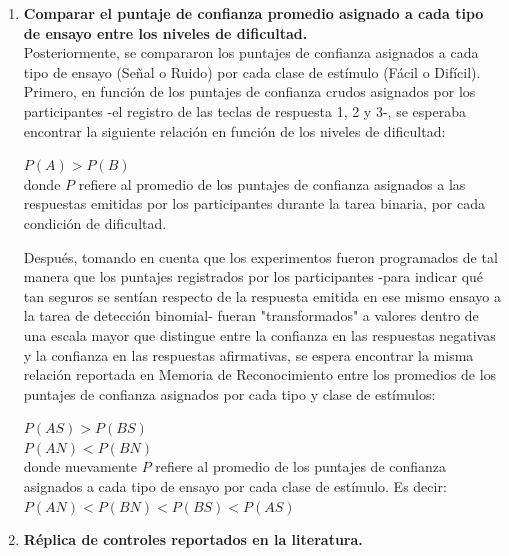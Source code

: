 \begin{enumerate}
\item \textbf{Comparar el puntaje de confianza promedio asignado a cada tipo de ensayo entre los niveles de dificultad.}\\

Posteriormente, se compararon los puntajes de confianza asignados a cada tipo de ensayo (Señal o Ruido) por cada clase de estímulo (Fácil o Difícil).\\

Primero, en función de los puntajes de confianza crudos asignados por los participantes -el registro de las teclas de respuesta 1, 2 y 3-, se esperaba encontrar la siguiente relación en función de los niveles de dificultad:

\begin{center}
$P(A) > P(B)$\\
donde $P$ refiere al promedio de los puntajes de confianza asignados a las respuestas emitidas por los participantes durante la tarea binaria, por cada condición de dificultad.\\
\end{center}

Después, tomando en cuenta que los experimentos fueron programados de tal manera que los puntajes registrados por los participantes -para indicar qué tan seguros se sentían respecto de la respuesta emitida en ese mismo ensayo a la tarea de detección binomial- fueran "transformados" a valores dentro de una escala mayor que distingue entre la confianza en las respuestas negativas y la confianza en las respuestas afirmativas, se espera encontrar la misma relación reportada en Memoria de Reconocimiento entre los promedios de los puntajes de confianza asignados por cada tipo y clase de estímulos:\\

\begin{center}
$P(AS) > P(BS)$\\
$P(AN) < P(BN)$\\
donde nuevamente $P$ refiere al promedio de los puntajes de confianza asignados a cada tipo de ensayo por cada clase de estímulo. Es decir:\\
$P(AN) < P(BN) < P(BS) < P(AS)$\\
\end{center}

\item \textbf{Réplica de controles reportados en la literatura.}\\


\end{enumerate}
